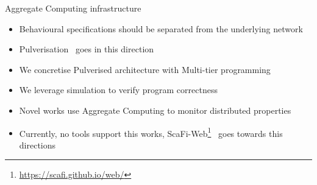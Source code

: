 \begin{frame}{Aggregate Computing infrastructure}
  \begin{card}[Deployment]
    \begin{itemize}
      \item Behavioural specifications should be separated from the underlying network
      \item Pulverisation~\cite{pulverisation} goes in this direction
      \item We concretise Pulverised architecture with Multi-tier programming~\cite{scafiloci}
    \end{itemize}
  \end{card}

  \begin{card}
    \begin{itemize}
      \item We leverage simulation to verify program correctness
      \item Novel works \cite{monitors} use Aggregate Computing to monitor distributed properties
      \item Currently, no tools support this works, ScaFi-Web\footnote{\url{https://scafi.github.io/web/}}~\cite{scafiweb} goes towards this directions
    \end{itemize}
  \end{card}
\end{frame}